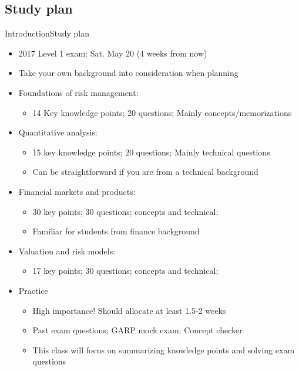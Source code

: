 \subsection{Study plan}
\begin{frame}{Introduction}{Study plan}
\begin{itemize}
	\item 2017 Level 1 exam: Sat. May 20 (4 weeks from now)
	\item Take your own background into consideration when planning
	\item Foundations of risk management: 
	\begin{itemize}
		\item 14 Key knowledge points; 20 questions; Mainly concepts/memorizations
	\end{itemize} 
	\item Quantitative analysis: 
	\begin{itemize}
		\item 15 key knowledge points; 20 questions; Mainly technical questions
		\item Can be straightforward if you are from a technical background
	\end{itemize}
	\item Financial markets and products: 
	\begin{itemize}
		\item 30 key points; 30 questions; concepts and technical;
		\item Familiar for students from finance background
	\end{itemize}	
	\item Valuation and risk models:
	\begin{itemize}
		\item 17 key points; 30 questions; concepts and technical;
	\end{itemize}
	\item Practice
	\begin{itemize}
		\item High importance! Should allocate at least 1.5-2 weeks
		\item Past exam questions; GARP mock exam; Concept checker
		\item {\color{red} This class will focus on summarizing knowledge points and solving exam questions}
	\end{itemize}
	
	
\end{itemize}
\end{frame}


